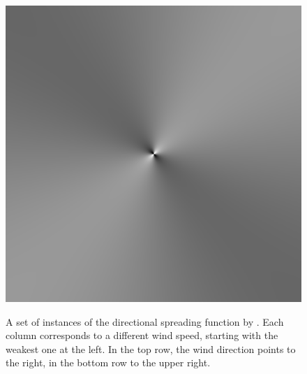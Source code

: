 \begin{figure}
{ }
 \hfill
 \subtop
 {
 \includegraphics[scale=0.25]{figures/unified_dfilt_wur_sqrt200.png}
 }
\caption[The directional spreading function as introduced by
\citet{article:Elfouhaily1997}.]{
A set of instances of the directional spreading function by
\citet{article:Elfouhaily1997}. Each column 
corresponds to a different wind speed, starting with the weakest one at the 
left. In the top row, the wind direction points to the right, in the bottom row 
to the upper right.}
\label{fig:unified_directional_filter}
\end{figure}
%

